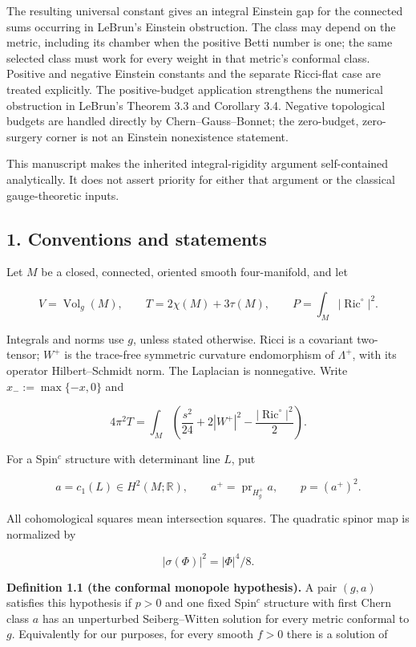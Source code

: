 \documentclass[
  10pt,
]{article}
\begin{document}
The resulting universal constant gives an integral Einstein gap for the
connected sums occurring in LeBrun's Einstein obstruction. The class may
depend on the metric, including its chamber when the positive Betti
number is one; the same selected class must work for every weight in
that metric's conformal class. Positive and negative Einstein constants
and the separate Ricci-flat case are treated explicitly. The
positive-budget application strengthens the numerical obstruction in
LeBrun's Theorem 3.3 and Corollary 3.4. Negative topological budgets are
handled directly by Chern--Gauss--Bonnet; the zero-budget, zero-surgery
corner is not an Einstein nonexistence statement.

This manuscript makes the inherited integral-rigidity argument
self-contained analytically. It does not assert priority for either that
argument or the classical gauge-theoretic inputs.

\hypertarget{conventions-and-statements}{%
\subsection{1. Conventions and
statements}\label{conventions-and-statements}}

Let \(M\) be a closed, connected, oriented smooth four-manifold, and let

\[
 V=\operatorname{Vol}_g(M),\qquad T=2\chi(M)+3\tau(M),\qquad
 P=\int_M|\operatorname{Ric}^{\circ}|^2.
\]

Integrals and norms use \(g\), unless stated otherwise. Ricci is a
covariant two-tensor; \(W^+\) is the trace-free symmetric curvature
endomorphism of \(\Lambda^+\), with its operator Hilbert--Schmidt norm.
The Laplacian is nonnegative. Write \(x_-:=\max\{-x,0\}\) and

\[
 4\pi^2T=\int_M\left(\frac{s^2}{24}+2|W^+|^2
                          -\frac{|\operatorname{Ric}^{\circ}|^2}{2}\right).
 \tag{1.1}
\]

For a Spin\(^c\) structure with determinant line \(L\), put

\[
 a=c_1(L)\in H^2(M;\mathbb R),\qquad
 a^+=\operatorname{pr}_{H_g^+}a,\qquad p=(a^+)^2.
\]

All cohomological squares mean intersection squares. The quadratic
spinor map is normalized by

\[
 |\sigma(\Phi)|^2=|\Phi|^4/8.
\]

\textbf{Definition 1.1 (the conformal monopole hypothesis).} A pair
\((g,a)\) satisfies this hypothesis if \(p>0\) and one fixed Spin\(^c\)
structure with first Chern class \(a\) has an unperturbed
Seiberg--Witten solution for every metric conformal to \(g\).
Equivalently for our purposes, for every smooth \(f>0\) there is a
solution of
\end{document}
